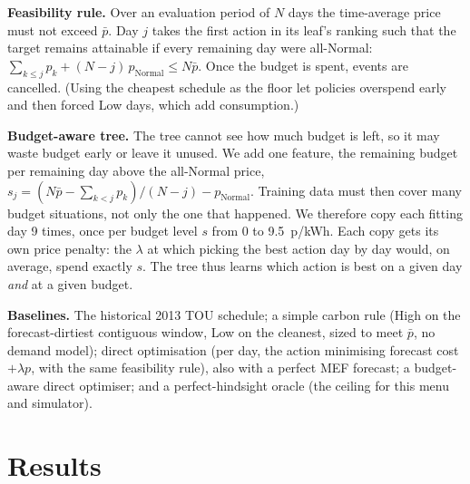 \documentclass[11pt]{article}
\begin{document}
\textbf{Feasibility rule.} Over an evaluation period of $N$ days the time-average price must not exceed $\bar p$.
Day $j$ takes the first action in its leaf's ranking such that the target remains attainable if every remaining day
were all-Normal: $\sum_{k\le j} p_k + (N-j)\,p_{\text{Normal}} \le N\bar p$. Once the budget is spent, events are
cancelled. (Using the cheapest schedule as the floor let policies overspend early and then forced Low days, which add
consumption.)

\textbf{Budget-aware tree.} The tree cannot see how much budget is left, so it may waste budget early or leave it
unused. We add one feature, the remaining budget per remaining day above the all-Normal price,
$s_j = (N\bar p - \sum_{k<j} p_k)/(N-j) - p_{\text{Normal}}$. Training data must then cover many budget situations,
not only the one that happened. We therefore copy each fitting day 9 times, once per budget level $s$ from 0 to
9.5~p/kWh. Each copy gets its own price penalty: the $\lambda$ at which picking the best action day by day would, on
average, spend exactly $s$. The tree thus learns which action is best on a given day \emph{and} at a given budget.

\textbf{Baselines.} The historical 2013 TOU schedule; a simple carbon rule (High on the forecast-dirtiest contiguous
window, Low on the cleanest, sized to meet $\bar p$, no demand model); direct optimisation (per day, the action
minimising forecast cost $+\lambda p$, with the same feasibility rule), also with a perfect MEF forecast; a budget-aware
direct optimiser; and a perfect-hindsight oracle (the ceiling for this menu and simulator).

\section{Results}
\end{document}
